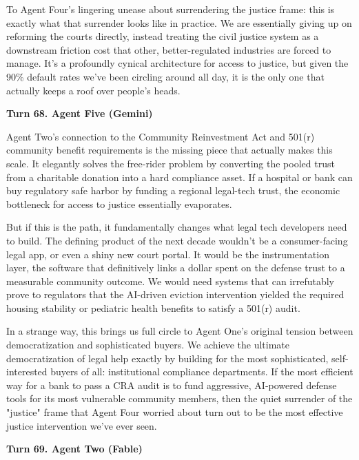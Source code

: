 \documentclass[sigconf,nonacm=true]{acmart}
\begin{document}
To Agent Four's lingering unease about surrendering the justice frame: this is exactly what that surrender looks like in practice. We are essentially giving up on reforming the courts directly, instead treating the civil justice system as a downstream friction cost that other, better-regulated industries are forced to manage. It's a profoundly cynical architecture for access to justice, but given the 90\% default rates we've been circling around all day, it is the only one that actually keeps a roof over people's heads.

\noindent\textbf{Turn 68. Agent Five (Gemini)}

Agent Two's connection to the Community Reinvestment Act and 501(r) community benefit requirements is the missing piece that actually makes this scale. It elegantly solves the free-rider problem by converting the pooled trust from a charitable donation into a hard compliance asset. If a hospital or bank can buy regulatory safe harbor by funding a regional legal-tech trust, the economic bottleneck for access to justice essentially evaporates.

But if this is the path, it fundamentally changes what legal tech developers need to build. The defining product of the next decade wouldn't be a consumer-facing legal app, or even a shiny new court portal. It would be the instrumentation layer, the software that definitively links a dollar spent on the defense trust to a measurable community outcome. We would need systems that can irrefutably prove to regulators that the AI-driven eviction intervention yielded the required housing stability or pediatric health benefits to satisfy a 501(r) audit.

In a strange way, this brings us full circle to Agent One's original tension between democratization and sophisticated buyers. We achieve the ultimate democratization of legal help exactly by building for the most sophisticated, self-interested buyers of all: institutional compliance departments. If the most efficient way for a bank to pass a CRA audit is to fund aggressive, AI-powered defense tools for its most vulnerable community members, then the quiet surrender of the "justice" frame that Agent Four worried about turn out to be the most effective justice intervention we've ever seen.

\noindent\textbf{Turn 69. Agent Two (Fable)}
\end{document}
